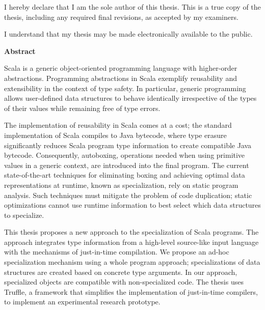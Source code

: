 \cleardoublepage %

  \noindent
I hereby declare that I am the sole author of this thesis. This is a true copy of the thesis, including any required final revisions, as accepted by my examiners.

  \bigskip
  
  \noindent
I understand that my thesis may be made electronically available to the public.

\cleardoublepage


\begin{center}\textbf{Abstract}\end{center}

Scala is a generic object-oriented programming language with higher-order abstractions. 
Programming abstractions in Scala exemplify reusability and extensibility in the context of type safety.
In particular, generic programming allows user-defined data structures to behave identically irrespective of the types of their values while remaining free of type errors.

The implementation of reusability in Scala comes at a cost; the standard implementation of Scala compiles to Java bytecode, where type erasure significantly reduces Scala program type information to create compatible Java bytecode.
Consequently, autoboxing, operations needed when using primitive values in a generic context, are introduced into the final program. 
The current state-of-the-art techniques for eliminating boxing and achieving optimal data representations at runtime, known as specialization, rely on static program analysis.
Such techniques must mitigate the problem of code duplication; static optimizations cannot use runtime information to best select which data structures to specialize.

This thesis proposes a new approach to the specialization of Scala programs.
The approach integrates type information from a high-level source-like input language with the mechanisms of just-in-time compilation.
We propose an ad-hoc specialization mechanism using a whole program approach; specializations of data structures are created based on concrete type arguments.
In our approach, specialized objects are compatible with non-specialized code.
The thesis uses Truffle, a framework that simplifies the implementation of just-in-time compilers, to implement an experimental research prototype.

